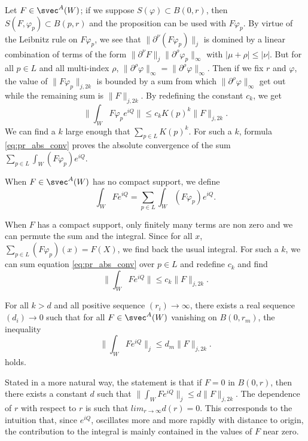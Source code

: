 Let $F\in\svec^A(W)$; if we suppose $S(\varphi)\subset B(0,r)$, then $S(F,\varphi_p)\subset B(p,r)$ and the proposition can be used with $F\varphi_p$. By virtue of the Leibnitz rule on $F\varphi_p$, we see that $\| \partial^{\nu}(F\varphi_p) \|_j$ is domined by a linear combination of terms of the form $\| \partial^{\nu}F \|_j\| \partial^{\rho}\varphi_p \|_{\infty}$ with $| \mu+\rho |\leq | \nu |$. But for all $p\in L$ and all multi-index $\rho$, $\| \partial^{\rho}\varphi \|_{\infty}=\| \partial^{\rho}\varphi \|_{\infty}$. Then if we fix $r$ and $\varphi$, the value of $\| F\varphi_p \|_{j,2k}$ is bounded by a sum from which  $\| \partial^{\rho}\varphi \|_{\infty}$ get out while the remaining sum is $\| F \|_{j,2k}$. By redefining the constant $c_k$, we get
\begin{equation} \label{eq:pr_abs_conv}
	\| \int_WF\varphi_pe^{iQ} \|\leq c_kK(p)^k\| F \|_{j,2k}.
\end{equation}
We can find a $k$ large enough that $\sum_{p\in L}K(p)^k$. For such a $k$, formula \eqref{eq:pr_abs_conv} proves the absolute convergence of the sum $\sum_{p\in L}\int_W(F\varphi_p)e^{iQ}$.

\begin{definition} \label{def:intFeiQ}
	When $F\in\svec^A(W)$ has no compact support, we define
	\begin{equation}
		\int_WFe^{iQ}=\sum_{p\in L}\int_W(F\varphi_p)e^{iQ}.
	\end{equation}

\end{definition}
When $F$ has a compact support, only finitely many terms are non zero and we can permute the sum and the integral. Since for all $x$, $\sum_{p\in L}(F\varphi_p)(x)=F(X)$, we find back the usual integral. For such a $k$, we can sum equation \eqref{eq:pr_abs_conv} over $p\in L$ and redefine $c_k$ and find
\[
	\| \int_W Fe^{iQ} \|\leq c_k\| F \|_{j,2k}.
\]

\begin{proposition}   \label{prop:leqd_m}
	For all $k>d$ and all positive sequence $(r_i)\to\infty$, there exists a real sequence $(d_i)\to 0$ such that for all $F\in\svec^A(W)$ vanishing on $B(0,r_m)$, the inequality
	\[
		\| \int_WFe^{iQ} \|_j\leq d_m\| F \|_{j,2k}.
	\]
	holds.
\end{proposition}

Stated in a more natural way, the statement is that if $F=0$ in $B(0,r)$, then there exists a constant $d$ such that $\| \int_WFe^{iQ} \|_j\leq d\| F \|_{j,2k}$. The dependence of $r$ with respect to $r$ is such that $lim_{r\to\infty}d(r)=0$. This corresponds to the intuition that, since $e^{iQ}$, oscillates more and more rapidly with distance to origin, the contribution to the integral is mainly contained in the values of $F$ near zero.

